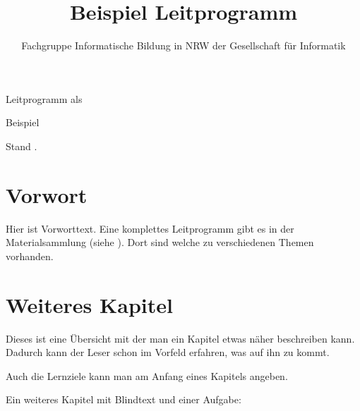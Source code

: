 \documentclass[12pt,a4paper,parskip=half,chapterprefix,bibliography=totoc,footheight=57pt,numbers=noendperiod]{scrreprt}
\title{Beispiel Leitprogramm}
\author{Fachgruppe Informatische Bildung in NRW der Gesellschaft für Informatik}
\begin{document}
    \begin{titlepage}
        \begin{center}
            \begin{Large}
                Leitprogramm als
            \end{Large}
        \end{center}
        \begin{center}
            \begin{huge}
                Beispiel
            \end{huge}
        \end{center}
        \begin{center}
            Stand \gfiGetDay. \monatWort{\gfiGetMonth} \gfiGetYear
        \end{center}
        \vfil
        \begin{center}
        \end{center}
    \end{titlepage}

    \tableofcontents

\chapter{Vorwort}
    Hier ist Vorworttext. Eine komplettes Leitprogramm gibt es in der Materialsammlung (siehe \autocite{Pieper2014}). Dort sind welche zu verschiedenen Themen vorhanden.

    \blindtext

\chapter{Weiteres Kapitel}
    \begin{uebersichtBox}
        Dieses ist eine Übersicht mit der man ein Kapitel etwas näher beschreiben kann. Dadurch kann der Leser schon im Vorfeld erfahren, was auf ihn zu kommt.
    \end{uebersichtBox}
    \begin{lernzieleBox}
        Auch die Lernziele kann man am Anfang eines Kapitels angeben.
    \end{lernzieleBox}


    Ein weiteres Kapitel mit Blindtext und einer Aufgabe: \blindtext
\end{document}

